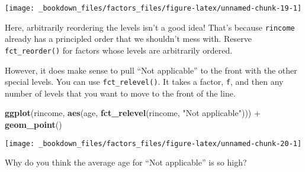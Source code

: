 \documentclass[]{book}
\newenvironment{Shaded}{\begin{snugshade}}{\end{snugshade}}
\newcommand{\KeywordTok}[1]{\textcolor[rgb]{0.13,0.29,0.53}{\textbf{{#1}}}}
\newcommand{\DataTypeTok}[1]{\textcolor[rgb]{0.13,0.29,0.53}{{#1}}}
\newcommand{\StringTok}[1]{\textcolor[rgb]{0.31,0.60,0.02}{{#1}}}
\newcommand{\OtherTok}[1]{\textcolor[rgb]{0.56,0.35,0.01}{{#1}}}
\newcommand{\NormalTok}[1]{{#1}}
\begin{document}
\begin{Shaded}
\end{Shaded}

\begin{center}\texttt{[image: \_bookdown\_files/factors\_files/figure-latex/unnamed-chunk-19-1]} \end{center}

Here, arbitrarily reordering the levels isn't a good idea! That's
because \texttt{rincome} already has a principled order that we
shouldn't mess with. Reserve \texttt{fct\_reorder()} for factors whose
levels are arbitrarily ordered.

However, it does make sense to pull ``Not applicable'' to the front with
the other special levels. You can use \texttt{fct\_relevel()}. It takes
a factor, \texttt{f}, and then any number of levels that you want to
move to the front of the line.

\begin{Shaded}
\begin{Highlighting}[]
\KeywordTok{ggplot}\NormalTok{(rincome, }\KeywordTok{aes}\NormalTok{(age, }\KeywordTok{fct_relevel}\NormalTok{(rincome, }\StringTok{"Not applicable"}\NormalTok{))) +}
\StringTok{  }\KeywordTok{geom_point}\NormalTok{()}
\end{Highlighting}
\end{Shaded}

\begin{center}\texttt{[image: \_bookdown\_files/factors\_files/figure-latex/unnamed-chunk-20-1]} \end{center}

Why do you think the average age for ``Not applicable'' is so high?
\end{document}
